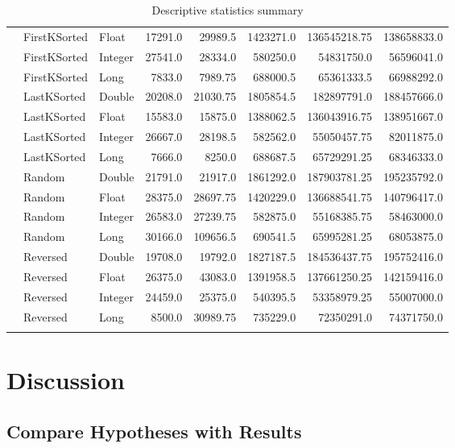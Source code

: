 \documentclass[unicode,11pt,a4paper,oneside,numbers=endperiod,openany]{scrartcl}
\begin{document}
\begin{center}
\begin{longtable}{|l|l|l|r|r|r|r|r|}
            & FirstKSorted & Float & 17291.0 & 29989.5 & 1423271.0 & 136545218.75 & 138658833.0 \\
            & FirstKSorted & Integer & 27541.0 & 28334.0 & 580250.0 & 54831750.0 & 56596041.0 \\
            & FirstKSorted & Long & 7833.0 & 7989.75 & 688000.5 & 65361333.5 & 66988292.0 \\
            & LastKSorted & Double & 20208.0 & 21030.75 & 1805854.5 & 182897791.0 & 188457666.0 \\
            & LastKSorted & Float & 15583.0 & 15875.0 & 1388062.5 & 136043916.75 & 138951667.0 \\
            & LastKSorted & Integer & 26667.0 & 28198.5 & 582562.0 & 55050457.75 & 82011875.0 \\
            & LastKSorted & Long & 7666.0 & 8250.0 & 688687.5 & 65729291.25 & 68346333.0 \\
            & Random & Double & 21791.0 & 21917.0 & 1861292.0 & 187903781.25 & 195235792.0 \\
            & Random & Float & 28375.0 & 28697.75 & 1420229.0 & 136688541.75 & 140796417.0 \\
            & Random & Integer & 26583.0 & 27239.75 & 582875.0 & 55168385.75 & 58463000.0 \\
            & Random & Long & 30166.0 & 109656.5 & 690541.5 & 65995281.25 & 68053875.0 \\
            & Reversed & Double & 19708.0 & 19792.0 & 1827187.5 & 184536437.75 & 195752416.0 \\
            & Reversed & Float & 26375.0 & 43083.0 & 1391958.5 & 137661250.25 & 142159416.0 \\
            & Reversed & Integer & 24459.0 & 25375.0 & 540395.5 & 53358979.25 & 55007000.0 \\
            & Reversed & Long & 8500.0 & 30989.75 & 735229.0 & 72350291.0 & 74371750.0 \\
            \hline
                    \caption{Descriptive statistics summary}
        \label{descr_table}
        \end{longtable}
    \end{center}



\section{Discussion}

    \subsection{Compare Hypotheses with Results}
\end{document}

